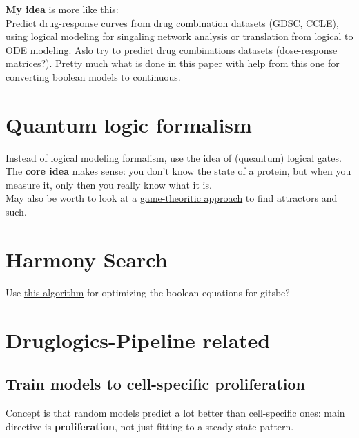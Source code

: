 \documentclass[12pt,]{book}
\theoremstyle{definition}
\theoremstyle{definition}
\theoremstyle{definition}
\theoremstyle{remark}
\begin{document}
\textbf{My idea} is more like this:\\
Predict drug-response curves from drug combination datasets (GDSC, CCLE),
using logical modeling for singaling network analysis or translation from
logical to ODE modeling. Aslo try to predict drug combinations datasets
(dose-response matrices?). Pretty much what is done in this \href{https://doi.org/10.1016/j.cels.2018.10.013}{paper} with help from \href{https://doi.org/10.1186/1752-0509-3-98}{this one}
for converting boolean models to continuous.

\hypertarget{quantum-logic-formalism}{%
\section{Quantum logic formalism}\label{quantum-logic-formalism}}

Instead of logical modeling formalism, use the idea of (queantum) logical gates.
The \textbf{core idea} makes sense: you don't know the state of a protein, but when
you measure it, only then you really know what it is.\\
May also be worth to look at a \href{https://doi.org/10.1007/11885191_18}{game-theoritic approach}
to find attractors and such.

\hypertarget{harmony-search}{%
\section{Harmony Search}\label{harmony-search}}

Use \href{https://doi.org/10.1016/j.proeng.2016.07.510}{this algorithm} for
optimizing the boolean equations for gitsbe?

\hypertarget{druglogics-pipeline-related}{%
\section{Druglogics-Pipeline related}\label{druglogics-pipeline-related}}

\hypertarget{train-models-to-cell-specific-proliferation}{%
\subsection{Train models to cell-specific proliferation}\label{train-models-to-cell-specific-proliferation}}

Concept is that random models predict a lot better than cell-specific ones:
main directive is \textbf{proliferation}, not just fitting to a steady state pattern.
\end{document}
